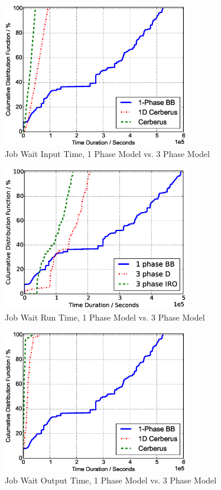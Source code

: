 \begin{figure}[!t]
        \centering
        \includegraphics[width=3.2in]{Draw3Pvs1P/1000jobs_3p_vs_1p_wait_in}
        \caption{Job Wait Input Time, 1 Phase Model vs. 3 Phase Model}
        \label{Fig:3Pvs1PWaitIn}
\end{figure}
\begin{figure}[!t]
        \centering
        \includegraphics[width=3.2in]{Draw3Pvs1P/1000jobs_3p_vs_1p_wait_run}
        \caption{Job Wait Run Time, 1 Phase Model vs. 3 Phase Model}
        \label{Fig:3Pvs1PWaitRun}
\end{figure}
\begin{figure}[!t]
        \centering
        \includegraphics[width=3.2in]{Draw3Pvs1P/1000jobs_3p_vs_1p_wait_out}
        \caption{Job Wait Output Time, 1 Phase Model vs. 3 Phase Model}
        \label{Fig:3Pvs1PWaitOut}
\end{figure}

